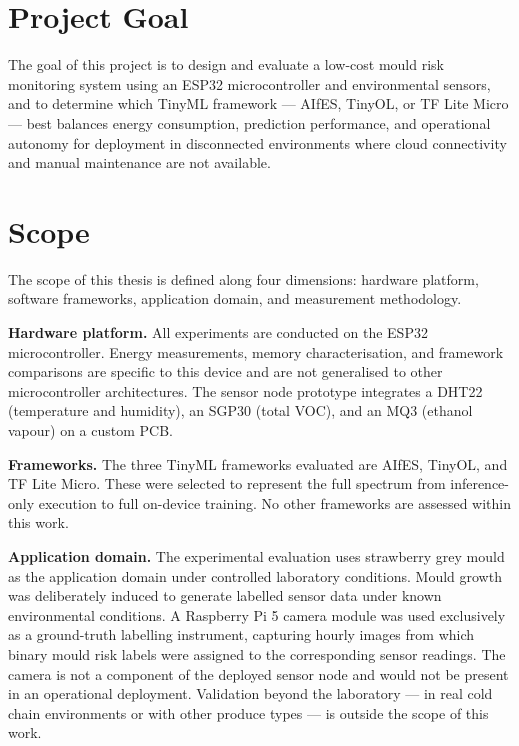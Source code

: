 \section{Project Goal}

The goal of this project is to design and evaluate a low-cost mould risk monitoring system using an ESP32 microcontroller and environmental sensors, and to determine which TinyML framework --- AIfES, TinyOL, or TF Lite Micro --- best balances energy consumption, prediction performance, and operational autonomy for deployment in disconnected environments where cloud connectivity and manual maintenance are not available.

\section{Scope}

The scope of this thesis is defined along four dimensions: hardware platform, software frameworks, application domain, and measurement methodology.

\textbf{Hardware platform.} All experiments are conducted on the ESP32 microcontroller. Energy measurements, memory characterisation, and framework comparisons are specific to this device and are not generalised to other microcontroller architectures. The sensor node prototype integrates a DHT22 (temperature and humidity), an SGP30 (total VOC), and an MQ3 (ethanol vapour) on a custom PCB.

\textbf{Frameworks.} The three TinyML frameworks evaluated are AIfES, TinyOL, and TF Lite Micro. These were selected to represent the full spectrum from inference-only execution to full on-device training. No other frameworks are assessed within this work.

\textbf{Application domain.} The experimental evaluation uses strawberry grey mould as the application domain under controlled laboratory conditions. Mould growth was deliberately induced to generate labelled sensor data under known environmental conditions. A Raspberry Pi 5 camera module was used exclusively as a ground-truth labelling instrument, capturing hourly images from which binary mould risk labels were assigned to the corresponding sensor readings. The camera is not a component of the deployed sensor node and would not be present in an operational deployment. Validation beyond the laboratory --- in real cold chain environments or with other produce types --- is outside the scope of this work.

